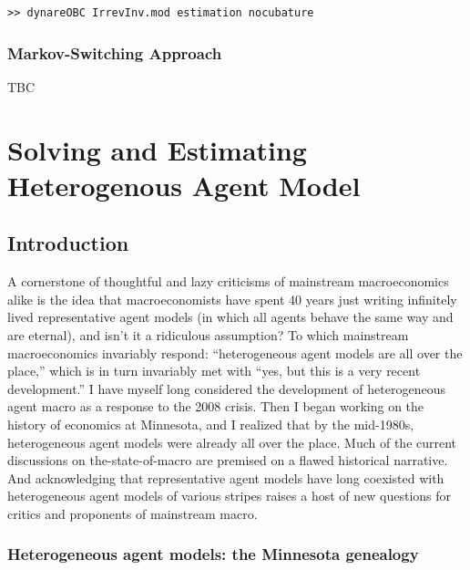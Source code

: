 \documentclass[10pt,math=newtx,citestyle=gb7714-2015,bibstyle=gb7714-2015]{elegantbook}
\begin{document}
{\begin{lstlisting}[frame=shadowbox]
	>> dynareOBC IrrevInv.mod estimation nocubature
\end{lstlisting}

\subsection{Markov-Switching Approach}

TBC

	
	\chapter{Solving and Estimating Heterogenous Agent Model}
	
	\section{Introduction}
	
	A cornerstone of thoughtful and lazy criticisms of mainstream macroeconomics alike is the idea that macroeconomists have spent 40 years just writing infinitely lived representative agent models (in which all agents behave the same way and are eternal), and isn’t it a ridiculous assumption? To which mainstream macroeconomics invariably respond: “heterogeneous agent models are all over the place,” which is in turn invariably met with “yes, but this is a very recent development.” I have myself long considered the development of heterogeneous agent macro as a response to the 2008 crisis. Then I began working on the history of economics at Minnesota, and I realized that by the mid-1980s, heterogeneous agent models were already all over the place. Much of the current discussions on the-state-of-macro are premised on a flawed historical narrative. And acknowledging that representative agent models have long coexisted with heterogeneous agent models of various stripes raises a host of new questions for critics and proponents of mainstream macro.
	
	\subsection{Heterogeneous agent models: the Minnesota genealogy}
	
}
\end{document}
